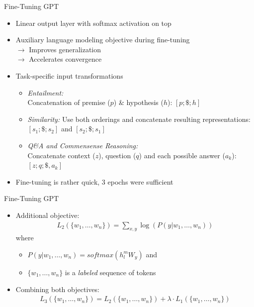 
\begin{vbframe}{Fine-Tuning GPT}

\vfill
			
\begin{itemize}
		\item Linear output layer with softmax activation on top
		\item Auxiliary language modeling objective during fine-tuning\\
					$\rightarrow$ Improves generalization\\
					$\rightarrow$ Accelerates convergence
		\item Task-specific input transformations
					\begin{itemize}
						\item \textit{Entailment:} \\ Concatenation of premise ($p$) \& hypothesis ($h$): $[p; \$; h]$
						\item \textit{Similarity:} Use both orderings and concatenate resulting representations: $[s_1; \$; s_2]$ and $[s_2; \$; s_1]$
						\item \textit{Q\&A and Commensense Reasoning:} \\ Concatenate context ($z$), question ($q$) and each possible answer ($a_k$): $[z; q; \$, a_k]$
					\end{itemize}
		\item Fine-tuning is rather quick, 3 epochs were sufficient
\end{itemize}

\vfill

\end{vbframe}


\begin{vbframe}{Fine-Tuning GPT}

\vfill

\begin{itemize}
		\item Additional objective:
					\begin{align*}
						L_2(\{w_1, \hdots, w_n\}) = \sum_{x,y} \log(P(y | w_1, \hdots, w_n))
					\end{align*}		
					where 
				\begin{itemize}
					\item $P(y | w_1, \hdots, w_n) = softmax(h_l^m W_y)$ and 
					\item $\{w_1, \hdots, w_n\}$ is a \textit{labeled} sequence of tokens
				\end{itemize}
		\item Combining both objectives: 
					\begin{align*}
						L_3(\{w_1, \hdots, w_n\}) = L_2(\{w_1, \hdots, w_n\}) + \lambda \cdot L_1(\{w_1, \hdots, w_n\})
					\end{align*}
\end{itemize}

\vfill

\end{vbframe}

